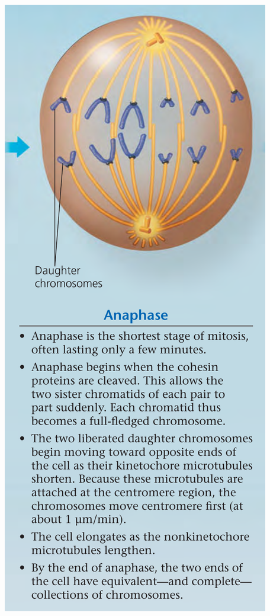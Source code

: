 \documentclass[11pt,ignorenonframetext,aspectratio=169]{beamer}
\begin{document}
\begin{frame}{}
\begin{columns}[T,onlytextwidth]
\begin{center}\includegraphics[width=0.64\linewidth]{../images/mitosis_animal_cell32} \end{center}




\end{columns}
\end{frame}
\end{document}
